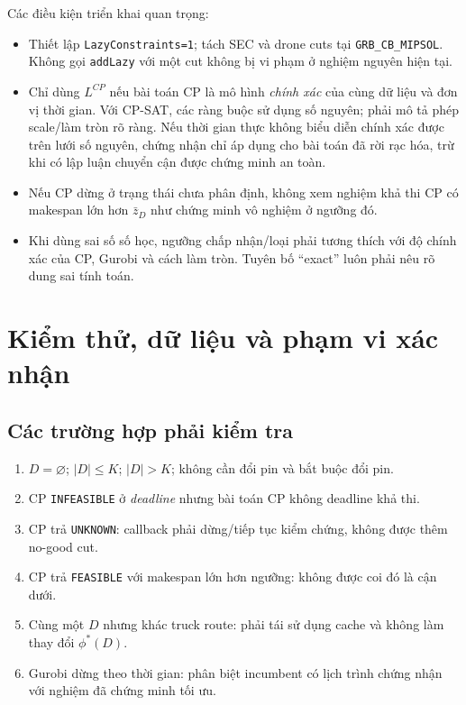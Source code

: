 \documentclass[11pt,a4paper]{article}
\theoremstyle{definition}
\theoremstyle{plain}
\theoremstyle{remark}
\newcommand{\opt}{\phi^*}
\begin{document}
Các điều kiện triển khai quan trọng:
\begin{itemize}
\item Thiết lập \texttt{LazyConstraints=1}; tách SEC và drone cuts tại \texttt{GRB\_CB\_MIPSOL}. Không gọi \texttt{addLazy} với một cut không bị vi phạm ở nghiệm nguyên hiện tại.
\item Chỉ dùng $L^{CP}$ nếu bài toán CP là mô hình \emph{chính xác} của cùng dữ liệu và đơn vị thời gian. Với CP-SAT, các ràng buộc sử dụng số nguyên; phải mô tả phép scale/làm tròn rõ ràng. Nếu thời gian thực không biểu diễn chính xác được trên lưới số nguyên, chứng nhận chỉ áp dụng cho bài toán đã rời rạc hóa, trừ khi có lập luận chuyển cận được chứng minh an toàn.
\item Nếu CP dừng ở trạng thái chưa phân định, không xem nghiệm khả thi CP có makespan lớn hơn $\bar z_D$ như chứng minh vô nghiệm ở ngưỡng đó.
\item Khi dùng sai số số học, ngưỡng chấp nhận/loại phải tương thích với độ chính xác của CP, Gurobi và cách làm tròn. Tuyên bố ``exact'' luôn phải nêu rõ dung sai tính toán.
\end{itemize}


\section{Kiểm thử, dữ liệu và phạm vi xác nhận}
\label{sec:validation}
\subsection{Các trường hợp phải kiểm tra}
\begin{enumerate}
\item $D=\varnothing$; $|D|\le K$; $|D|>K$; không cần đổi pin và bắt buộc đổi pin.
\item CP \texttt{INFEASIBLE} ở \emph{deadline} nhưng bài toán CP không deadline khả thi.
\item CP trả \texttt{UNKNOWN}: callback phải dừng/tiếp tục kiểm chứng, không được thêm no-good cut.
\item CP trả \texttt{FEASIBLE} với makespan lớn hơn ngưỡng: không được coi đó là cận dưới.
\item Cùng một $D$ nhưng khác truck route: phải tái sử dụng cache và không làm thay đổi $\opt(D)$.
\item Gurobi dừng theo thời gian: phân biệt incumbent có lịch trình chứng nhận với nghiệm đã chứng minh tối ưu.
\end{enumerate}
\end{document}
